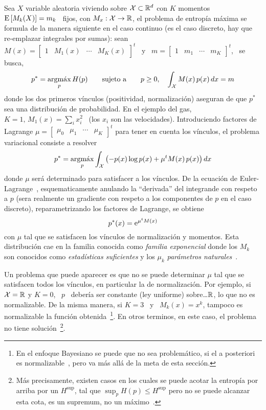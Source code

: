 Sea $X$ variable aleatoria viviendo  sobre $\mathcal{X} \subset \mathbb{R}^d$ con $K$ momentos
\  $\operatorname{E}\left[ M_k(X)  \right]  = m_k$  \ fijos,  con  $M_x: \mathcal{X}  \to \mathbb{R}$,  el
problema de  entrop\'ia m\'axima se  formula de la  manera siguiente en  el caso
continuo (es el caso discreto, hay que re-emplazar integrales por sumas): sean \
$M(x) = \begin{bmatrix} 1  & M_1(x) & \cdots & M_K(x) \end{bmatrix}^t$  \ y \ $m
= \begin{bmatrix} 1 & m_1 & \cdots & m_K \end{bmatrix}^t$, \ se busca,
%
\[
p^* = \operatorname*{argm\acute{a}x}_p H(p) \qquad \mbox{sujeto a} \qquad p \ge 0, \quad \int_{\mathcal{X}} M(x)
\, p(x) \, dx = m
\]
%
donde los dos primeros v\'inculos (positividad, normalizaci\'on) aseguran de que
$p^*$ sea una distribuci\'on de probabilidad. En  el ejemplo del gas, $K = 1, \,
M_1(x) = \sum_i x_i^2$ \ (los $x_i$ son las velocidades). Introduciendo factores
de   Lagrange   $\mu   =   \begin{bmatrix}    \mu_0   &   \mu_1   &   \cdots   &
  \mu_K  \end{bmatrix}^t$  para tener  en  cuenta  los  v\'inculos, el  problema
variacional   consiste  a   resolver~\cite{GelFom63,  Bru04,   Mil00,  CamMar09,
  CovTho06}
%
\[
p^* = \operatorname*{argm\acute{a}x}_p \int_{\mathcal{X}} \left( - p(x) \log p(x) + \mu^t M(x) \, p(x) \right) dx
\]
%
donde  $\mu$  ser\'a  determinado  para  satisfacer a  los  v\'inculos.   De  la
ecuaci\'on  de Euler-Lagrange~\cite{GelFom63, Bru04},  esquematicamente anulando
la ``derivada''  del integrande con respeto  a $p$ (sera  realmente un gradiente
con respeto a los componentes de  $p$ en el caso discreto), reparametrizando los
factores de Lagrange, se obtiene
%
\[
p^*(x) = \operatorname{e}^{\mu^t M(x)}
\]
%
con $\mu$  tal que se satisfacen  los v\'inculos de  normalizaci\'on y momentos.
Esta distribuci\'on  cae en la  familia conocida como {\it  familia exponencial}
donde  los $M_k$  son  conocidos  como {\it  estad\'isticas  suficientes} y  los
$\mu_k$ {\it par\'ametros naturales}~\cite{Dar35, Koo36, And70, Kay93, LehCas98,
  Rob07}.

Un problema que  puede aparecer es que  no se puede determinar $\mu$  tal que se
satisfacen  todos los  v\'inculos,  en particular  la  de normalizaci\'on.   Por
ejemplo,  si $\mathcal{X}  = \mathbb{R}$  y $K  = 0$,  \ $p$  \ deber\'ia  ser  constante (ley
uniforme) sobre\ldots $\mathbb{R}$, lo que no es normalizable. De la misma manera, si
$K  =  3$  \  y  \   $M_k(x)  =  x^k$,  tampoco  es  normalizable  la  funci\'on
obtenida~\footnote{En el  enfoque Bayesiano se puede que  no sea problem\'atico,
  si el  a posteriori es normalizable~\cite{Rob07},  pero va m\'as  all\'a de la
  meta de  esta secci\'on.}.  En  otros terminos, en  este caso, el  problema no
tiene soluci\'on~\footnote{M\'as  precisamente, existen  casos en los  cuales se
  puede acotar la entrop\'ia por arriba  por un $H^{\sup}$, tal que $\sup_p H(p)
  \le H^{\sup}$ pero no  se puede alcanzar esta cota, \ie es  un supremum, no un
  m\'aximo~\cite[sec.~12.3]{CovTho06}.}.

